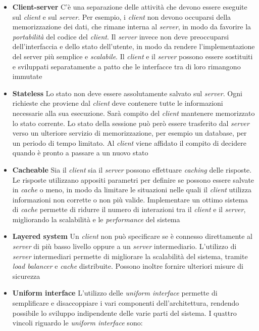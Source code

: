 \begin{itemize}
	\item \textbf{Client-server}
	C'è una separazione delle attività che devono essere eseguite sul \emph{client} e sul \emph{server}. Per esempio, i \emph{client} non devono occuparsi della memorizzazione dei dati, che rimane interna al \emph{server}, in modo da favorire la \emph{portabilità} del codice del \emph{client}. Il \emph{server} invece non deve preoccuparsi dell'interfaccia e dello stato dell'utente, in modo da rendere l'implementazione del server più semplice e \emph{scalabile}. Il \emph{client} e il \emph{server} possono essere sostituiti e sviluppati separatamente a patto che le interfacce tra di loro rimangono immutate
	\item \textbf{Stateless}
	Lo stato non deve essere assolutamente salvato sul \emph{server}. Ogni richieste che proviene dal \emph{client} deve contenere tutte le informazioni necessarie alla sua esecuzione. Sarà compito del \emph{client} mantenere memorizzato lo stato corrente. Lo stato della sessione può però essere trasferito dal \emph{server} verso un ulteriore servizio di memorizzazione, per esempio un database, per un periodo di tempo limitato. Al \emph{client} viene affidato il compito di decidere quando è pronto a passare a un nuovo stato
	\item \textbf{Cacheable}
	Sia il \emph{client} sia il \emph{server} possono effettuare \emph{caching} delle risposte. Le risposte utilizzano appositi parametri per definire se possono essere salvate in \emph{cache} o meno, in modo da limitare le situazioni nelle quali il \emph{client} utilizza informazioni non corrette o non più valide. Implementare un ottimo sistema di \emph{cache} permette di ridurre il numero di interazioni tra il \emph{client} e il \emph{server}, migliorando la scalabilità e le \emph{performance} del sistema
	\item \textbf{Layered system}
	Un \emph{client} non può specificare se è connesso direttamente al \emph{server} di più basso livello oppure a un \emph{server} intermediario. L'utilizzo di \emph{server} intermediari permette di migliorare la scalabilità del sistema, tramite \emph{load balancer} e \emph{cache} distribuite. Possono inoltre fornire ulteriori misure di sicurezza
	\item \textbf{Uniform interface}
	L'utilizzo delle \emph{uniform interface} permette di semplificare e disaccoppiare i vari componenti dell'architettura, rendendo possibile lo sviluppo indipendente delle varie parti del sistema. I quattro vincoli riguardo le \emph{uniform interface} sono:

\end{itemize}
